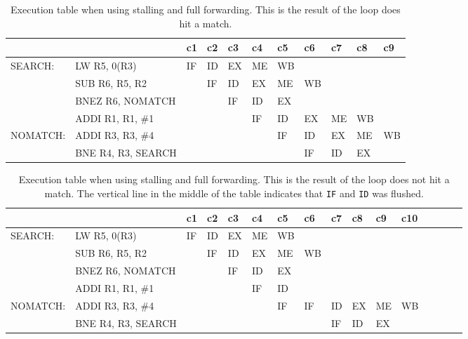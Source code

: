 \begin{landscape}
    \begin{table}[]
    \centering
    \begin{tabular}{lllllllllll}
    \hline
             &                                         & c1 & c2 & c3 & c4 & c5 & c6 & c7 & c8 & c9 \\ \hline
    SEARCH:  & \multicolumn{1}{l|}{LW R5, 0(R3)}       & IF & ID & EX & ME & WB &    &    &    &    \\
             & \multicolumn{1}{l|}{SUB R6, R5, R2}     &    & IF & ID & EX & ME & WB &    &    &    \\
             & \multicolumn{1}{l|}{BNEZ R6, NOMATCH}   &    &    & IF & ID & EX &    &    &    &    \\
             & \multicolumn{1}{l|}{ADDI R1, R1, \#1}   &    &    &    & IF & ID & EX & ME & WB &    \\
    NOMATCH: & \multicolumn{1}{l|}{ADDI R3, R3, \#4}   &    &    &    &    & IF & ID & EX & ME & WB \\
             & \multicolumn{1}{l|}{BNE R4, R3, SEARCH} &    &    &    &    &    & IF & ID & EX &    \\ \hline
    \end{tabular}
    \caption{Execution table when using stalling and full forwarding. This is the result of the loop does hit a match.}
    \label{tab:t21dhit}
    \end{table}

    \begin{table}[]
    \centering
    \begin{tabular}{llllllllllllllll}
    \hline
             &                                         & c1 & c2 & c3 & c4 & c5                      & c6 & c7 & c8 & c9 & c10 \\ \hline
    SEARCH:  & \multicolumn{1}{l|}{LW R5, 0(R3)}       & IF & ID & EX & ME & WB                      &    &    &    &    &     \\
             & \multicolumn{1}{l|}{SUB R6, R5, R2}     &    & IF & ID & EX & ME                      & WB &    &    &    &     \\
             & \multicolumn{1}{l|}{BNEZ R6, NOMATCH}   &    &    & IF & ID & EX                      &    &    &    &    &     \\
             & \multicolumn{1}{l|}{ADDI R1, R1, \#1}   &    &    &    & IF & \multicolumn{1}{l|}{ID} &    &    &    &    &     \\
    NOMATCH: & \multicolumn{1}{l|}{ADDI R3, R3, \#4}   &    &    &    &    & \multicolumn{1}{l|}{IF} & IF & ID & EX & ME & WB  \\
             & \multicolumn{1}{l|}{BNE R4, R3, SEARCH} &    &    &    &    &                         &    & IF & ID & EX &     \\ \hline
    \end{tabular}
    \caption{Execution table when using stalling and full forwarding. This is the result of the loop does not hit a match. The vertical line in the middle of the table indicates that \texttt{IF} and \texttt{ID} was flushed.}
    \label{tab:t21dmiss}
    \end{table}
\end{landscape}



